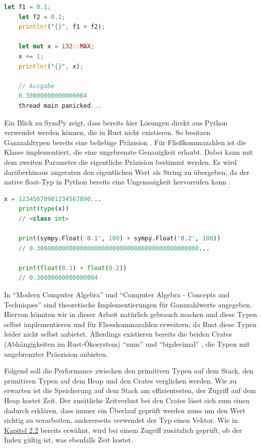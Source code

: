 \documentclass[11pt,a4paper, ngerman]{article}
\begin{document}
\begin{lstlisting}[language=rust, caption={Überlauf und Ungenauigkeit}]
    let f1 = 0.1;
    let f2 = 0.2;
    println!("{}", f1 + f2);

    let mut x = i32::MAX;
    x += 1;
    println!("{}", x);

    // Ausgabe
    0.30000000000000004
    thread main panicked...
\end{lstlisting}

Ein Blick zu SymPy zeigt, dass bereits hier Lösungen direkt aus Python verwendet werden können, die in Rust nicht existieren. So besitzen Ganzzahltypen bereits eine beliebige Präzision \cite{PythonDocuIntPrecision}. Für Fließkommazahlen ist die Klasse  implementiert, die eine ungebrenzte Genauigkeit erlaubt. Dabei kann mit dem zweiten Parameter die eigentliche Präzision bestimmt werden. Es wird darüberhinaus angeraten den eigentlichen Wert als String zu übergeben, da der native float-Typ in Python bereits eine Ungenauigkeit hervorrufen kann \cite{SymPyFloat}.

\begin{lstlisting}[language=Python, caption={SymPy Präzision}]
    x = 12345678901234567890...
    print(type(x))
    // <class int>

    print(sympy.Float('0.1', 100) + sympy.Float('0.2', 100))
    // 0.300000000000000000000000000000000000000000000...

    print(float(0.1) + float(0.2))
    // 0.30000000000000004
\end{lstlisting}

In ``Modern Computer Algebra'' \cite[S. 29 ff.]{Gathen2013} und ``Computer Algebra - Concepts and Techniques'' \cite[S. 81 ff.]{Lamagna2019} sind theoretische Implementierungen für Ganzzahlwerte angegeben. Hiervon könnten wir in dieser Arbeit natürlich gebrauch machen und diese Typen selbst implementieren und für Fliesskommazahlen erweitern, da Rust diese Typen leider nicht selbst anbietet. Allerdings existieren bereits die beiden Crates (Abhängigkeiten im Rust-Ökosystem) ``num'' \cite{CrateNum} und ``bigdecimal'' \cite{CrateBigdecimal}, die Typen mit ungebrenzter Präszision anbieten.

Folgend soll die Performance zwischen den primitiven Typen auf dem Stack, den primitiven Typen auf dem Heap und den Crates verglichen werden. Wie zu erwarten ist die Speicherung auf dem Stack am effizientesten, der Zugriff auf dem Heap kostet Zeit. Der zusätliche Zeitverlust bei den Crates lässt sich zum einen dadurch erklären, dass immer ein Überlauf geprüft werden muss um den Wert richtig zu verarbeiten, andererseits verwendet der Typ  einen Vektor. Wie in \hyperref[sec:kap2d2]{Kapitel 2.2} bereits erwähnt, wird bei einem Zugriff zusätzlich geprüft, ob der Index gültig ist, was ebenfalls Zeit kostet.
\end{document}
